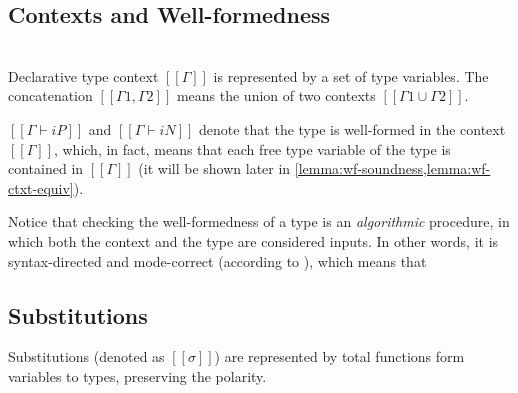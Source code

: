 \documentclass[acmsmall,natbib=false,review,anonymous]{acmart}
\begin{document}
\subsection{Contexts and Well-formedness}

\begin{definition}
  \hfill \\
  Declarative type context $[[Γ]]$ is represented by a set of 
  type variables. The concatenation $[[Γ1, Γ2]]$ means the 
  union of two contexts $[[Γ1 ∪ Γ2]]$.
\end{definition}

$[[Γ ⊢ iP]]$ and $[[Γ ⊢ iN]]$ denote that the type is well-formed in the context $[[Γ]]$,
which, in fact, means that each free type variable of the type is contained in $[[Γ]]$
(it will be shown later in \cref{lemma:wf-soundness,lemma:wf-ctxt-equiv}).

Notice that checking the well-formedness of a type
is an \emph{algorithmic} procedure, in which 
both the context and the type are considered inputs.
In other words, it is syntax-directed and mode-correct 
(according to \cite{dunfieldBidirectionalTyping2020}), 
which means that 

\begin{algorithm}
  \label{alg:wf}
  \hfill
  
  \begin{multicols}{2}
  \ottdefnWFTNiWF{}
  \columnbreak

  \ottdefnWFTPiWF{}
  \end{multicols}

\end{algorithm}


\subsection{Substitutions}

\begin{definition}[Substitution]
  Substitutions (denoted as $[[σ]]$) 
  are represented by total functions form variables to types, preserving the polarity. 
\end{definition}
\end{document}
